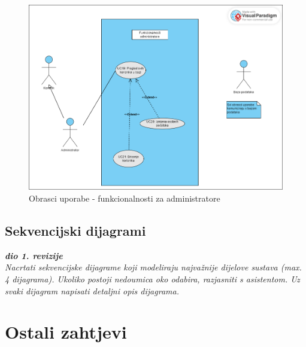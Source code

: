 					\begin{figure}[H]
						\includegraphics[scale=0.4]{dijagrami/obrasci_uporabe3.png} 
						\centering
						\caption{Obrasci uporabe - funkcionalnosti za administratore}
						\label{fig:obrasci_uporabe3}
					\end{figure}
				\eject		
				
			\subsection{Sekvencijski dijagrami}
				
				\textbf{\textit{dio 1. revizije}}\\
				
				\textit{Nacrtati sekvencijske dijagrame koji modeliraju najvažnije dijelove sustava (max. 4 dijagrama). Ukoliko postoji nedoumica oko odabira, razjasniti s asistentom. Uz svaki dijagram napisati detaljni opis dijagrama.}
				\eject
	
		\section{Ostali zahtjevi}
			 
